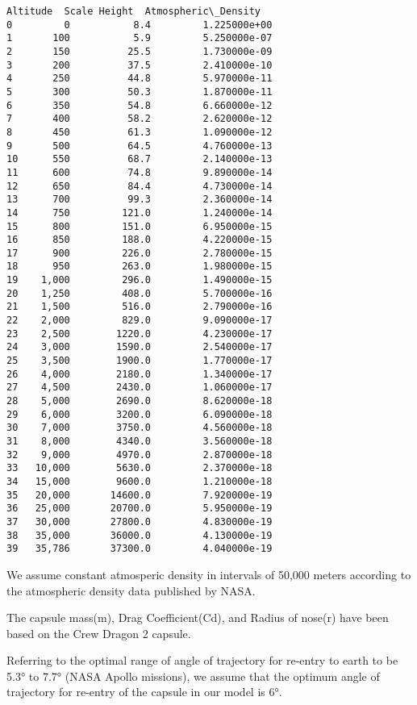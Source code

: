 \documentclass[11pt]{article}
\begin{document}
    \begin{Verbatim}[commandchars=\\\{\}]
   Altitude  Scale Height  Atmospheric\_Density
0         0           8.4         1.225000e+00
1       100           5.9         5.250000e-07
2       150          25.5         1.730000e-09
3       200          37.5         2.410000e-10
4       250          44.8         5.970000e-11
5       300          50.3         1.870000e-11
6       350          54.8         6.660000e-12
7       400          58.2         2.620000e-12
8       450          61.3         1.090000e-12
9       500          64.5         4.760000e-13
10      550          68.7         2.140000e-13
11      600          74.8         9.890000e-14
12      650          84.4         4.730000e-14
13      700          99.3         2.360000e-14
14      750         121.0         1.240000e-14
15      800         151.0         6.950000e-15
16      850         188.0         4.220000e-15
17      900         226.0         2.780000e-15
18      950         263.0         1.980000e-15
19    1,000         296.0         1.490000e-15
20    1,250         408.0         5.700000e-16
21    1,500         516.0         2.790000e-16
22    2,000         829.0         9.090000e-17
23    2,500        1220.0         4.230000e-17
24    3,000        1590.0         2.540000e-17
25    3,500        1900.0         1.770000e-17
26    4,000        2180.0         1.340000e-17
27    4,500        2430.0         1.060000e-17
28    5,000        2690.0         8.620000e-18
29    6,000        3200.0         6.090000e-18
30    7,000        3750.0         4.560000e-18
31    8,000        4340.0         3.560000e-18
32    9,000        4970.0         2.870000e-18
33   10,000        5630.0         2.370000e-18
34   15,000        9600.0         1.210000e-18
35   20,000       14600.0         7.920000e-19
36   25,000       20700.0         5.950000e-19
37   30,000       27800.0         4.830000e-19
38   35,000       36000.0         4.130000e-19
39   35,786       37300.0         4.040000e-19

    \end{Verbatim}

    We assume constant atmosperic density in intervals of 50,000 meters
according to the atmospheric density data published by NASA.

    The capsule mass(m), Drag Coefficient(Cd), and Radius of nose(r) have
been based on the Crew Dragon 2 capsule.

Referring to the optimal range of angle of trajectory for re-entry to
earth to be 5.3° to 7.7° (NASA Apollo missions), we assume that the
optimum angle of trajectory for re-entry of the capsule in our model is
6°.
\end{document}
